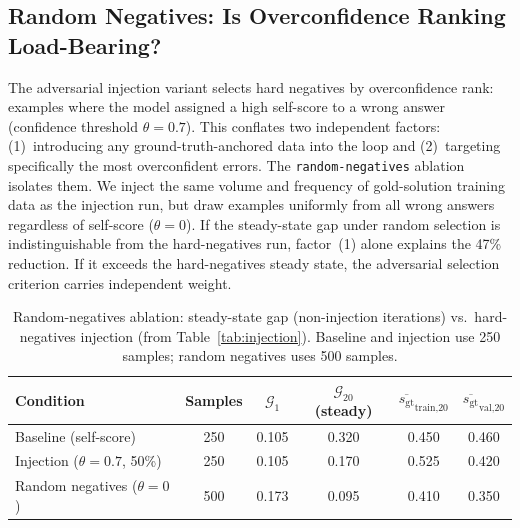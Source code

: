 \documentclass{article}
\newcommand{\gap}{\mathcal{G}}          %
\newcommand{\gt}{s_{\text{gt}}}         %
\begin{document}
\subsection{Random Negatives: Is Overconfidence Ranking Load-Bearing?}
\label{sec:random-negatives}

The adversarial injection variant selects hard negatives by overconfidence rank: examples
where the model assigned a high self-score to a wrong answer (confidence threshold
$\theta = 0.7$).
This conflates two independent factors: (1)~introducing any ground-truth-anchored data
into the loop and (2)~targeting specifically the most overconfident errors.
The \texttt{random-negatives} ablation isolates them.
We inject the same volume and frequency of gold-solution training data as the injection
run, but draw examples uniformly from all wrong answers regardless of self-score
($\theta = 0$).
If the steady-state gap under random selection is indistinguishable from the hard-negatives
run, factor~(1) alone explains the 47\% reduction.
If it exceeds the hard-negatives steady state, the adversarial selection criterion carries
independent weight.

\begin{table}[h]
\centering
\caption{Random-negatives ablation: steady-state gap (non-injection iterations)
vs.\ hard-negatives injection (from Table~\ref{tab:injection}).
Baseline and injection use 250 samples; random negatives uses 500 samples.}
\label{tab:random-negatives}
\small
\begin{tabular}{lccccc}
\toprule
Condition & Samples & $\gap_1$ & $\gap_{20}$ (steady) & $\overline{\gt}_\text{train,20}$ & $\overline{\gt}_\text{val,20}$ \\
\midrule
Baseline (self-score)             & 250 & 0.105 & 0.320 & 0.450 & 0.460 \\
Injection ($\theta{=}0.7$, 50\%)  & 250 & 0.105 & 0.170 & 0.525 & 0.420 \\
Random negatives ($\theta{=}0$)   & 500 & 0.173 & 0.095 & 0.410 & 0.350 \\
\bottomrule
\end{tabular}
\end{table}
\end{document}
